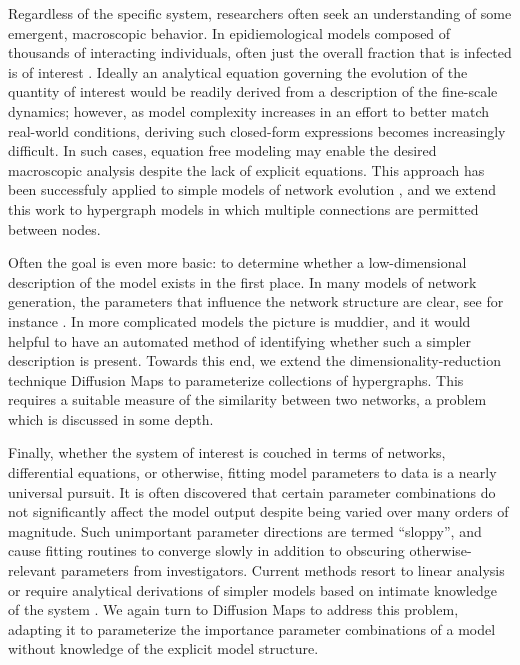 Regardless of the specific system, researchers often seek an
understanding of some emergent, macroscopic behavior. In
epidiemological models composed of thousands of interacting
individuals, often just the overall fraction that is infected is of
interest \cite{shi_sis_2008}. Ideally an analytical equation governing
the evolution of the quantity of interest would be readily derived
from a description of the fine-scale dynamics; however, as model
complexity increases in an effort to better match real-world
conditions, deriving such closed-form expressions becomes increasingly
difficult. In such cases, equation free modeling may enable the
desired macroscopic analysis despite the lack of explicit
equations. This approach has been successfuly applied to simple models
of network evolution \cite{bold_equation-free_2014}, and we extend
this work to hypergraph models in which multiple connections are
permitted between nodes.

Often the goal is even more basic: to determine whether a
low-dimensional description of the model exists in the first place. In
many models of network generation, the parameters that influence the
network structure are clear, see for instance
\cite{erdos_random_1959,chung_connected_2002,watts_collective_1998,
  Barabasi}. In more complicated models the picture is muddier, and it
would helpful to have an automated method of identifying whether such
a simpler description is present. Towards this end, we extend the
dimensionality-reduction technique Diffusion Maps to parameterize
collections of hypergraphs. This requires a suitable measure of the
similarity between two networks, a problem which is discussed in some
depth.

Finally, whether the system of interest is couched in terms of
networks, differential equations, or otherwise, fitting model
parameters to data is a nearly universal pursuit. It is often
discovered that certain parameter combinations do not significantly
affect the model output despite being varied over many orders of
magnitude. Such unimportant parameter directions are termed
``sloppy'', and cause fitting routines to converge slowly in addition
to obscuring otherwise-relevant parameters from investigators. Current
methods resort to linear analysis or require analytical derivations
of simpler models based on intimate knowledge of the system
\cite{Sensitivity Analysis;,transtrum_model_2014}. We again turn to Diffusion Maps to
address this problem, adapting it to parameterize the importance
parameter combinations of a model without knowledge of the explicit
model structure.

